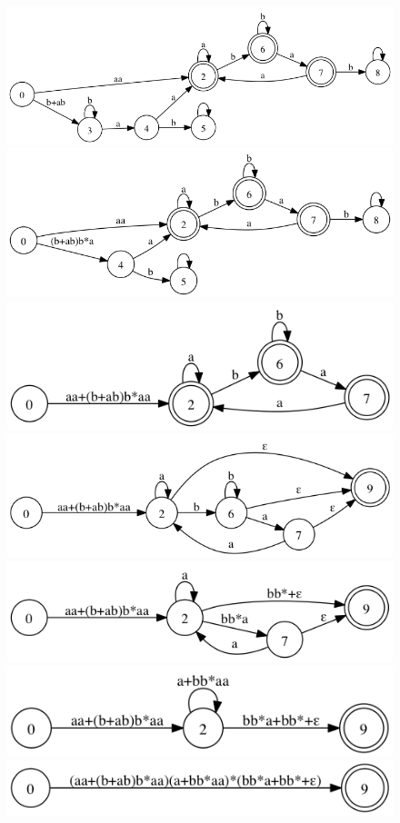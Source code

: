 \documentclass[paper=a4, fontsize=11pt]{scrartcl} %
\begin{document}
\begin{figure}[hp]
  \centering
  \includegraphics[width=.7\textwidth]{11-1.gv.2.png}
  \includegraphics[width=.7\textwidth]{11-1.gv.3.png}
  \includegraphics[width=.7\textwidth]{11-1.gv.4.png}
  \includegraphics[width=.7\textwidth]{11-1.gv.5.png}
  \includegraphics[width=.7\textwidth]{11-1.gv.6.png}
  \includegraphics[width=.7\textwidth]{11-1.gv.7.png}
  \includegraphics[width=.7\textwidth]{11-1.gv.8.png}
\end{figure}
\end{document}
